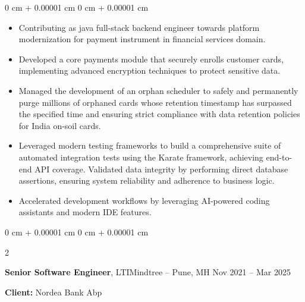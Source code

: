 \documentclass[10pt, letterpaper]{article}
\newenvironment{highlights}{
    \begin{itemize}[
        topsep=0.10 cm,
        parsep=0.10 cm,
        partopsep=0pt,
        itemsep=0pt,
        leftmargin=0 cm + 10pt
    ]
}{
    \end{itemize}
} %
\newenvironment{onecolentry}{
    \begin{adjustwidth}{
        0 cm + 0.00001 cm
    }{
        0 cm + 0.00001 cm
    }
}{
    \end{adjustwidth}
} %
\newenvironment{twocolentry}[2][]{
    \onecolentry
    \def\secondColumn{#2}
    \setcolumnwidth{\fill, 4.5 cm}
    \begin{paracol}{2}
}{
    \switchcolumn \raggedleft \secondColumn
    \end{paracol}
    \endonecolentry
} %
\begin{document}
        \vspace{0.10 cm}
        \begin{onecolentry}
            \begin{highlights}
                \item Contributing as java full-stack backend engineer towards platform modernization for payment instrument in financial services domain.
                \item Developed a core payments module that securely enrolls customer cards, implementing advanced encryption techniques to protect sensitive data.
                \item Managed the development of an orphan scheduler to safely and permanently purge millions of orphaned cards whose retention timestamp has surpassed the specified time and ensuring strict compliance with data retention policies for India on-soil cards.
                \item Leveraged modern testing frameworks to build a comprehensive suite of automated integration tests using the Karate framework, achieving end-to-end API coverage. Validated data integrity by performing direct database assertions, ensuring system reliability and adherence to business logic.
                \item Accelerated development workflows by leveraging AI-powered coding assistants and modern IDE features.

            \end{highlights}
        \end{onecolentry}


        \vspace{0.35 cm}

        \begin{twocolentry}{
            Nov 2021 – Mar 2025
        }
            \textbf{Senior Software Engineer}, LTIMindtree -- Pune, MH\end{twocolentry}
        \textbf{Client:} Nordea Bank Abp
\end{document}
